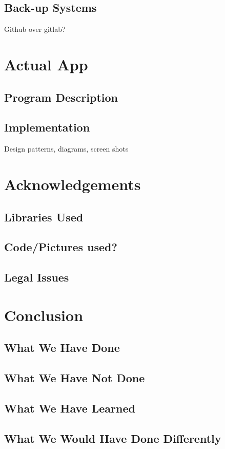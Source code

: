\documentclass{article}
\begin{document}
\subsection{Back-up Systems}
Github over gitlab?
\section{Actual App}
\subsection{Program Description}
\subsection{Implementation}
Design patterns, diagrams, screen shots
\section{Acknowledgements}
\subsection{Libraries Used}
\subsection{Code/Pictures used?}
\subsection{Legal Issues}
\section{Conclusion}
\subsection{What We Have Done}
\subsection{What We Have Not Done}
\subsection{What We Have Learned}
\subsection{What We Would Have Done Differently}
\end{document}
